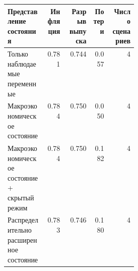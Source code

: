 \begin{tabular}{p{0.30\linewidth}rrrr}
\toprule
Представление состояния & Инфляция & Разрыв выпуска & Потери & Число сценариев \\
\midrule
Только наблюдаемые переменные & 0.781 & 0.744 & 0.057 & 4 \\
Макроэкономическое состояние & 0.784 & 0.750 & 0.050 & 4 \\
Макроэкономическое состояние + скрытый режим & 0.784 & 0.750 & 0.182 & 4 \\
Распределительно расширенное состояние & 0.783 & 0.746 & 0.180 & 4 \\
\bottomrule
\end{tabular}